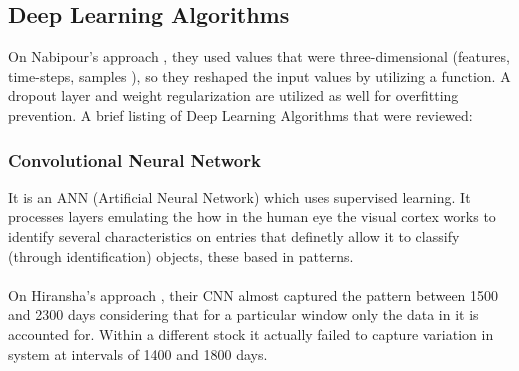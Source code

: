 \documentclass[conference]{IEEEtran}
\begin{document}
\subsection{Deep Learning Algorithms}

On Nabipour's approach \cite{nabipour2020predicting}, they used values that were three-dimensional (features, time-steps, samples ), so they reshaped the input values by utilizing a function. A dropout layer and weight regularization are utilized as well for overfitting prevention.
A brief listing of Deep Learning Algorithms that were reviewed:

\subsubsection{Convolutional Neural Network}
It is an ANN (Artificial Neural Network) which uses supervised learning. It processes layers emulating the how in the human eye the visual cortex works to identify several characteristics on entries that definetly allow it to classify (through identification) objects, these based in patterns.
\\\\
On Hiransha's approach \cite{M2018}, their CNN almost captured the pattern between 1500 and 2300 days considering that for a particular window only the data in it is accounted for. Within a different stock it actually failed to capture variation in system at intervals of 1400 and 1800 days.
\\\\
\end{document}
